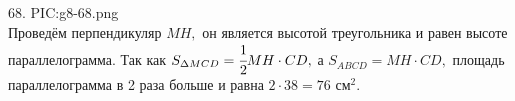 68. {{PIC:g8-68.png}}\\
Проведём перпендикуляр $MH,$ он является высотой треугольника и равен высоте параллелограмма. Так как $S_{\Delta MCD}=\cfrac{1}{2}MH\cdot CD,$ а $S_{ABCD}=MH\cdot CD,$ площадь параллелограмма в 2 раза больше и равна $2\cdot38=76\text{ см}^2.$\\
